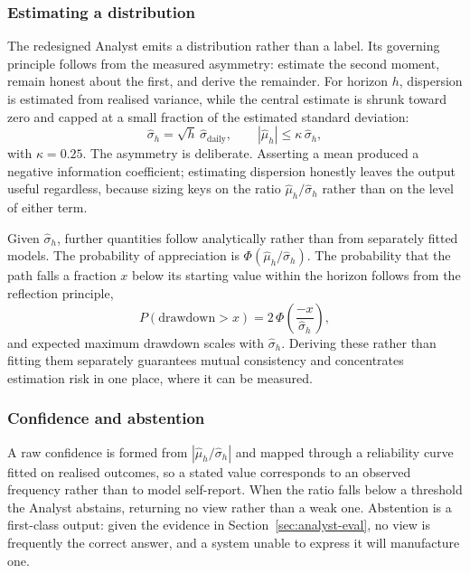 \documentclass[conference]{IEEEtran}
\begin{document}
\subsubsection{Estimating a distribution}
The redesigned Analyst emits a distribution rather than a label. Its
governing principle follows from the measured asymmetry: estimate the second
moment, remain honest about the first, and derive the remainder. For horizon
$h$, dispersion is estimated from realised variance, while the central
estimate is shrunk toward zero and capped at a small fraction of the
estimated standard deviation:
\begin{equation}
\hat{\sigma}_h = \sqrt{h}\,\hat{\sigma}_{\text{daily}}, \qquad
|\hat{\mu}_h| \leq \kappa\,\hat{\sigma}_h,
\label{eq:dist}
\end{equation}
with $\kappa = 0.25$. The asymmetry is deliberate. Asserting a mean produced
a negative information coefficient; estimating dispersion honestly leaves the
output useful regardless, because sizing keys on the ratio
$\hat{\mu}_h/\hat{\sigma}_h$ rather than on the level of either term.

Given $\hat{\sigma}_h$, further quantities follow analytically rather than
from separately fitted models. The probability of appreciation is
$\Phi(\hat{\mu}_h/\hat{\sigma}_h)$. The probability that the path falls a
fraction $x$ below its starting value within the horizon follows from the
reflection principle,
\begin{equation}
P(\text{drawdown} > x) = 2\,\Phi\!\left(\frac{-x}{\hat{\sigma}_h}\right),
\label{eq:dd}
\end{equation}
and expected maximum drawdown scales with $\hat{\sigma}_h$. Deriving these
rather than fitting them separately guarantees mutual consistency and
concentrates estimation risk in one place, where it can be measured.

\subsubsection{Confidence and abstention}
A raw confidence is formed from $|\hat{\mu}_h/\hat{\sigma}_h|$ and mapped
through a reliability curve fitted on realised outcomes, so a stated value
corresponds to an observed frequency rather than to model self-report. When
the ratio falls below a threshold the Analyst abstains, returning no view
rather than a weak one. Abstention is a first-class output: given the
evidence in Section~\ref{sec:analyst-eval}, no view is frequently the correct
answer, and a system unable to express it will manufacture one.
\end{document}
